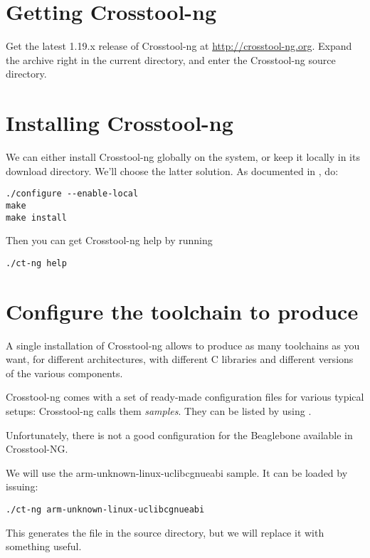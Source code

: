 \section{Getting Crosstool-ng}

Get the latest 1.19.x release of Crosstool-ng at
\url{http://crosstool-ng.org}. Expand the archive right in the current
directory, and enter the Crosstool-ng source directory.

\section{Installing Crosstool-ng}

We can either install Crosstool-ng globally on the system, or keep it
locally in its download directory. We'll choose the latter
solution. As documented in
, do:

\begin{verbatim}
./configure --enable-local
make
make install
\end{verbatim}

Then you can get Crosstool-ng help by running

\begin{verbatim}
./ct-ng help
\end{verbatim}

\section{Configure the toolchain to produce}

A single installation of Crosstool-ng allows to produce as many
toolchains as you want, for different architectures, with different C
libraries and different versions of the various components.

Crosstool-ng comes with a set of ready-made configuration files for
various typical setups: Crosstool-ng calls them {\em samples}. They can be
listed by using .

Unfortunately, there is not a good configuration for the Beaglebone available in Crosstool-NG.

We will use the arm-unknown-linux-uclibcgnueabi sample. It can be loaded by issuing:

\begin{verbatim}
./ct-ng arm-unknown-linux-uclibcgnueabi
\end{verbatim}

This generates the  file in the source directory, but we will replace it with
something useful.

